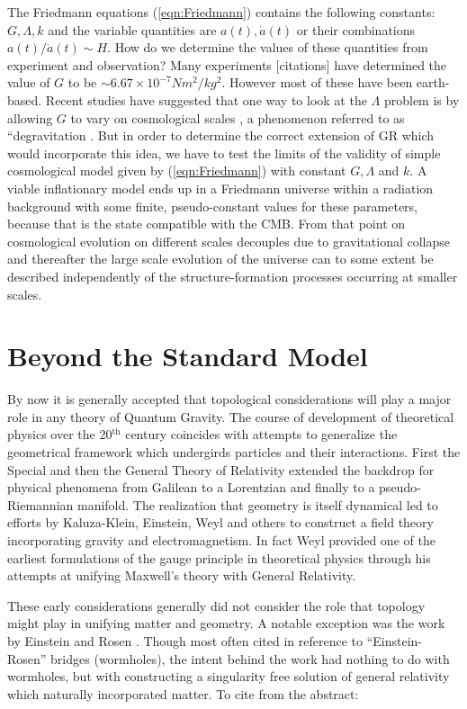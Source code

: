 \begin{doublespace}
The Friedmann equations (\ref{eqn:Friedmann}) contains the following constants: $G, \Lambda, k$ and the variable quantities are $a(t), \dot a(t)$ or their combinations $a(t)/\dot a(t) \sim H$. How do we determine the values of these quantities from experiment and observation? Many experiments [citations] have determined the value of $G$ to be $\sim 6.67 \times 10^{-7} N m^{2}/kg^{2}$. However most of these have been earth-based. Recent studies have suggested that one way to look at the $\Lambda$ problem is by allowing $G$ to vary on cosmological scales \cite{Dvali2007Degravitation}, a phenomenon referred to as ``degravitation . But in order to determine the correct extension of GR which would incorporate this idea, we have to test the limits of the validity of simple cosmological model given by (\ref{eqn:Friedmann}) with constant $G, \Lambda$ and $k$. A viable inflationary model ends up in a Friedmann universe within a radiation background with  some finite, pseudo-constant values for these parameters, because that is the state compatible with the CMB. From that point on cosmological evolution on different scales decouples due to gravitational collapse and thereafter the large scale evolution of the universe can to some extent be described independently of the structure-formation processes occurring at smaller scales.

\section{Beyond the Standard Model}

By now it is generally accepted that topological considerations will
play a major role in any theory of Quantum Gravity. The course of
development of theoretical physics over the 20$^{\text{th}}$ century coincides
with attempts to generalize the geometrical framework which undergirds
particles and their interactions. First the Special and then the General
Theory of Relativity extended the backdrop for physical phenomena
from Galilean to a Lorentzian and finally to a pseudo-Riemannian manifold.
The realization that geometry is itself dynamical led to efforts by Kaluza-Klein, Einstein, Weyl and others to construct a field theory incorporating gravity and electromagnetism. In fact Weyl provided one of the earliest formulations of the gauge principle in theoretical physics through his attempts at unifying Maxwell's theory with General Relativity.

These early considerations generally did not consider the role that
topology might play in unifying matter and geometry. A notable exception
was the work by Einstein and Rosen \cite{Einstein1935Particle}. Though most often cited in reference to ``Einstein-Rosen'' bridges (wormholes), the intent behind the work had nothing to do with wormholes, but with constructing a singularity free solution of general relativity which naturally incorporated matter. To cite from the abstract:


\end{doublespace}
